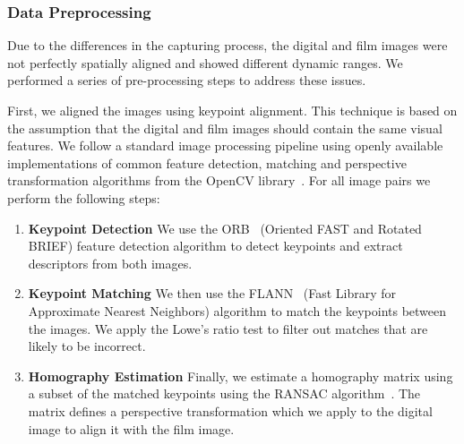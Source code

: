 \subsubsection*{Data Preprocessing}
\label{subsubsec:preprocessing}

Due to the differences in the capturing process, the digital and film images
were not perfectly spatially aligned and showed different dynamic ranges. We
performed a series of pre-processing steps to address these issues. 

First, we aligned the images using keypoint alignment. This technique is based on the assumption that the digital and film images should contain the same visual features. We follow a standard image processing pipeline using openly available implementations of common feature detection, matching and perspective transformation algorithms from the OpenCV library~\cite{opencv}. For all image pairs we perform the following steps:

\begin{enumerate}
    \item \textbf{Keypoint Detection} We use the ORB~\cite{orb} (Oriented FAST and Rotated BRIEF) feature detection algorithm to detect keypoints and extract descriptors from both images.
    \item \textbf{Keypoint Matching} We then use the FLANN~\cite{flann} (Fast Library for Approximate Nearest Neighbors) algorithm to match the keypoints between the images. We apply the Lowe's ratio test to filter out matches that are likely to be incorrect.
    \item \textbf{Homography Estimation} Finally, we estimate a homography matrix using a subset of the matched keypoints using the RANSAC algorithm~\cite{ransac}. The matrix defines a perspective transformation which we apply to the digital image to align it with the film image.
\end{enumerate}



